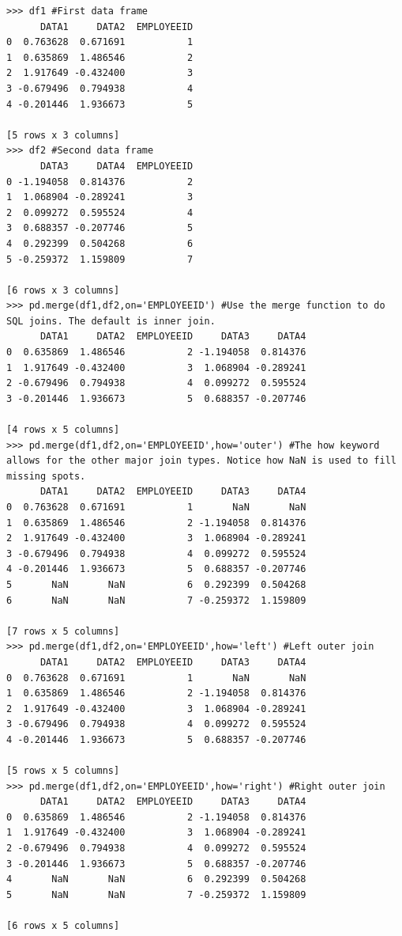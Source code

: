 \begin{lstlisting}
>>> df1 #First data frame
      DATA1     DATA2  EMPLOYEEID
0  0.763628  0.671691           1
1  0.635869  1.486546           2
2  1.917649 -0.432400           3
3 -0.679496  0.794938           4
4 -0.201446  1.936673           5

[5 rows x 3 columns]
>>> df2 #Second data frame
      DATA3     DATA4  EMPLOYEEID
0 -1.194058  0.814376           2
1  1.068904 -0.289241           3
2  0.099272  0.595524           4
3  0.688357 -0.207746           5
4  0.292399  0.504268           6
5 -0.259372  1.159809           7

[6 rows x 3 columns]
>>> pd.merge(df1,df2,on='EMPLOYEEID') #Use the merge function to do SQL joins. The default is inner join.
      DATA1     DATA2  EMPLOYEEID     DATA3     DATA4
0  0.635869  1.486546           2 -1.194058  0.814376
1  1.917649 -0.432400           3  1.068904 -0.289241
2 -0.679496  0.794938           4  0.099272  0.595524
3 -0.201446  1.936673           5  0.688357 -0.207746

[4 rows x 5 columns]
>>> pd.merge(df1,df2,on='EMPLOYEEID',how='outer') #The how keyword allows for the other major join types. Notice how NaN is used to fill missing spots.
      DATA1     DATA2  EMPLOYEEID     DATA3     DATA4
0  0.763628  0.671691           1       NaN       NaN
1  0.635869  1.486546           2 -1.194058  0.814376
2  1.917649 -0.432400           3  1.068904 -0.289241
3 -0.679496  0.794938           4  0.099272  0.595524
4 -0.201446  1.936673           5  0.688357 -0.207746
5       NaN       NaN           6  0.292399  0.504268
6       NaN       NaN           7 -0.259372  1.159809

[7 rows x 5 columns]
>>> pd.merge(df1,df2,on='EMPLOYEEID',how='left') #Left outer join
      DATA1     DATA2  EMPLOYEEID     DATA3     DATA4
0  0.763628  0.671691           1       NaN       NaN
1  0.635869  1.486546           2 -1.194058  0.814376
2  1.917649 -0.432400           3  1.068904 -0.289241
3 -0.679496  0.794938           4  0.099272  0.595524
4 -0.201446  1.936673           5  0.688357 -0.207746

[5 rows x 5 columns]
>>> pd.merge(df1,df2,on='EMPLOYEEID',how='right') #Right outer join
      DATA1     DATA2  EMPLOYEEID     DATA3     DATA4
0  0.635869  1.486546           2 -1.194058  0.814376
1  1.917649 -0.432400           3  1.068904 -0.289241
2 -0.679496  0.794938           4  0.099272  0.595524
3 -0.201446  1.936673           5  0.688357 -0.207746
4       NaN       NaN           6  0.292399  0.504268
5       NaN       NaN           7 -0.259372  1.159809

[6 rows x 5 columns]
\end{lstlisting}


